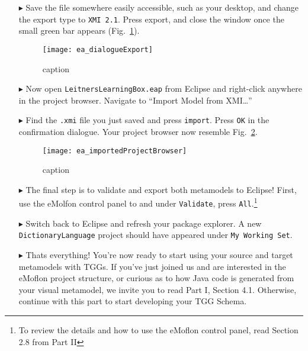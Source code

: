 \begin{itemize}
\item[$\blacktriangleright$] Save the file somewhere easily accessible, such as your desktop, and change the export type to \texttt{XMI 2.1}. Press export,
and close the window once the small green bar appears (Fig.~\ref{fig:export}).

\vspace{0.5cm}

\begin{figure}[htbp]
\begin{center}
  \texttt{[image: ea\_dialogueExport]}
  \caption{caption}
  \label{fig:export}
\end{center}
\end{figure}

\item[$\blacktriangleright$] Now open \texttt{LeitnersLearningBox.eap} from Eclipse and right-click anywhere in the project browser. Navigate to ``Import
Model from XMI\ldots''

\item[$\blacktriangleright$] Find the \texttt{.xmi} file you just saved and press \texttt{import}. Press \texttt{OK} in the confirmation dialogue. Your project
browser now resemble Fig.~\ref{fig:importProBrowser}.

\begin{figure}[htbp]
\begin{center}
  \texttt{[image: ea\_importedProjectBrowser]}
  \caption{caption}
  \label{fig:importProBrowser}
\end{center}
\end{figure}

\item[$\blacktriangleright$] The final step is to validate and export both metamodels to Eclipse! First, use the eMolfon control panel to and under
\texttt{Validate}, press \texttt{All}.\footnote{To review the details and how to use the eMoflon control panel, read Section 2.8 from Part II}

\item[$\blacktriangleright$] Switch back to Eclipse and refresh your package explorer. A new \texttt{DictionaryLanguage} project should have appeared under
\texttt{My Working Set}.

\item[$\blacktriangleright$] Thats everything! You're now ready to start using your source and target metamodels with TGGs. If you've just joined us and are
interested in the eMoflon project structure, or curious as to how Java code is generated from your visual metamodel, we invite you to read Part I, Section 4.1.
Otherwise, continue with this part to start developing your TGG Schema.


\end{itemize}

